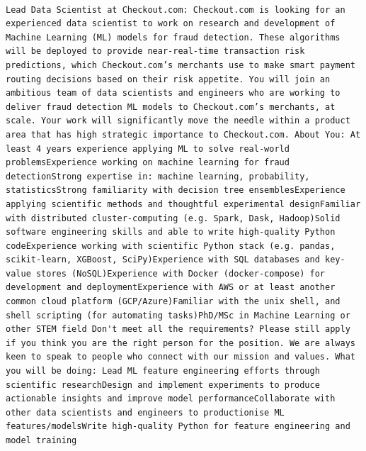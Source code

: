 \documentclass[
]{article}
\begin{document}
\begin{verbatim}
                                                                                                                                                                                                                                                                                                                     Lead Data Scientist at Checkout.com: Checkout.com is looking for an experienced data scientist to work on research and development of Machine Learning (ML) models for fraud detection. These algorithms will be deployed to provide near-real-time transaction risk predictions, which Checkout.com’s merchants use to make smart payment routing decisions based on their risk appetite. You will join an ambitious team of data scientists and engineers who are working to deliver fraud detection ML models to Checkout.com’s merchants, at scale. Your work will significantly move the needle within a product area that has high strategic importance to Checkout.com. About You: At least 4 years experience applying ML to solve real-world problemsExperience working on machine learning for fraud detectionStrong expertise in: machine learning, probability, statisticsStrong familiarity with decision tree ensemblesExperience applying scientific methods and thoughtful experimental designFamiliar with distributed cluster-computing (e.g. Spark, Dask, Hadoop)Solid software engineering skills and able to write high-quality Python codeExperience working with scientific Python stack (e.g. pandas, scikit-learn, XGBoost, SciPy)Experience with SQL databases and key-value stores (NoSQL)Experience with Docker (docker-compose) for development and deploymentExperience with AWS or at least another common cloud platform (GCP/Azure)Familiar with the unix shell, and shell scripting (for automating tasks)PhD/MSc in Machine Learning or other STEM field Don't meet all the requirements? Please still apply if you think you are the right person for the position. We are always keen to speak to people who connect with our mission and values. What you will be doing: Lead ML feature engineering efforts through scientific researchDesign and implement experiments to produce actionable insights and improve model performanceCollaborate with other data scientists and engineers to productionise ML features/modelsWrite high-quality Python for feature engineering and model training

\end{verbatim}
\end{document}
